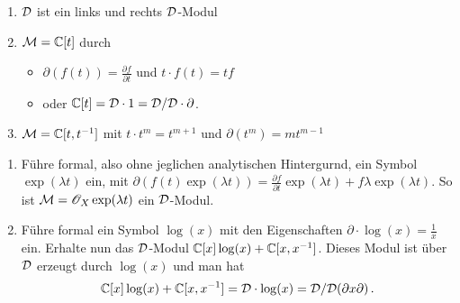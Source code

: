 \begin{exmp}
\cite[Exmp 2.2]{ArkhipovDmod}
\begin{enumerate}
\item $\mathcal{D}$ ist ein links und rechts $\mathcal{D}$-Modul
\item $\mathcal{M}=\mathbb{C}[t]$ durch
\begin{itemize}
\item $\partial(f(t))=\frac{\partial f}{\partial t}$ und
$t\cdot f(t)=tf$
\item oder \cite[Exmp 3.1.2]{ginzburg} $\mathbb{C}[t]=\mathcal{D}\cdot1=\mathcal{D}/\mathcal{D}\cdot\partial$.
\end{itemize}
\item $\mathcal{M}=\mathbb{C}[t,t^{-1}]$ mit $t\cdot t^{m}=t^{m+1}$ und
$\partial(t^m)=mt^{m-1}$
\end{enumerate}
\end{exmp}
\begin{exmp} 
\begin{enumerate}
\item \cite[Exmp 2.2]{ArkhipovDmod}
Führe formal, also ohne jeglichen analytischen Hintergurnd, ein Symbol
$\exp(\lambda t)$ ein, mit $\partial(f(t)\exp(\lambda t))=\frac{\partial
f}{\partial t}\exp(\lambda t)+f\lambda\exp(\lambda t)$.  So ist
$\mathcal{M}=\mathscr{O}_X\exp(\lambda t)$ ein $\mathcal{D}$-Modul.
\item \cite[Exmp 3.1.4]{ginzburg}
Führe formal ein Symbol $\log(x)$ mit den Eigenschaften
$\partial\cdot\log(x)=\frac{1}{x}$ ein. Erhalte nun das $\mathcal{D}$-Modul
$\mathbb{C}[x]\log(x)+\mathbb{C}[x,x^{-1}]$. Dieses Modul ist über $\mathcal{D}$ erzeugt durch
$\log(x)$ und man hat
\[
\mathbb{C}[x]\log(x)+\mathbb{C}[x,x^{-1}]=\mathcal{D}\cdot\log(x)=\mathcal{D}\slash\mathcal{D}(\partial x\partial) \,.
\]
\end{enumerate}
\end{exmp}

\begin{comment}
\begin{lem}\cite[Lem 2.3.3.]{sabbah_cimpa90}
Sei $\cM$ ein links $\cD$-Modul von endlichem Typ, welches auch von endlichem
Typ über $\Ckx$ ist. Dann ist $\cM$ bereits ein freies $\C\{x\}$-Modul.
\end{lem}
\begin{proof}
Siehe \cite[Lem 2.3.3.]{sabbah_cimpa90}.
\end{proof}
\begin{cor} \cite[Cor 2.3.4.]{sabbah_cimpa90}
Falls $\cM$ ein links $\cD$-Modul von endlichem typ, welches außerdem ein
endich dimensionaler Vektorraum ist, so ist schon $\cM=\{0\}$.
\end{cor}
\end{comment}

